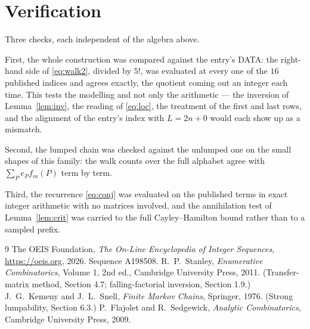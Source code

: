 \documentclass[11pt,a4paper]{article}
\theoremstyle{plain}
\theoremstyle{definition}
\begin{document}
\section{Verification}

Three checks, each independent of the algebra above.

First, the whole construction was compared against the entry's DATA: the right-hand side of
\eqref{eq:walk2}, divided by $5!$, was evaluated at every one of the $16$
published indices and agrees exactly, the quotient coming out an integer each time. This
tests the modelling and not only the arithmetic --- the inversion of Lemma~\ref{lem:inv},
the reading of \eqref{eq:loc}, the treatment of the first and last rows, and the
alignment of the entry's index with $L=2n+0$ would each show up as a mismatch.

Second, the lumped chain was checked against the unlumped one on the small shapes of this
family: the walk counts over the full alphabet agree with $\sum_P e_Pf_m(P)$ term by term.

Third, the recurrence \eqref{eq:conj} was evaluated on the published terms in exact integer
arithmetic with no matrices involved, and the annihilation test of Lemma~\ref{lem:crit} was
carried to the full Cayley--Hamilton bound rather than to a sampled prefix.

\begin{thebibliography}{9}
 The OEIS Foundation, \emph{The On-Line Encyclopedia of Integer
Sequences}, \url{https://oeis.org}, 2026. Sequence A198508.
 R.~P.~Stanley, \emph{Enumerative Combinatorics}, Volume 1, 2nd ed.,
Cambridge University Press, 2011. (Transfer-matrix method, Section 4.7; falling-factorial
inversion, Section 1.9.)
 J.~G.~Kemeny and J.~L.~Snell, \emph{Finite Markov Chains}, Springer,
1976. (Strong lumpability, Section 6.3.)
 P.~Flajolet and R.~Sedgewick, \emph{Analytic Combinatorics}, Cambridge
University Press, 2009.
\end{thebibliography}
\end{document}
